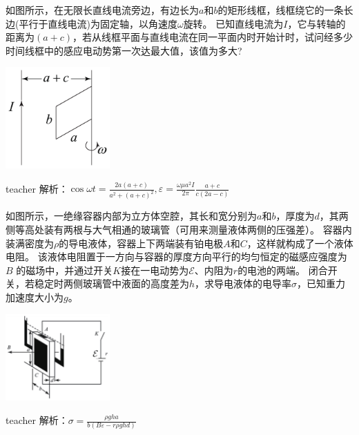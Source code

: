 \begin{example}
如图所示，在无限长直线电流旁边，有边长为$a $和$b $的矩形线框，线框绕它的一条长边(平行于直线电流)为固定轴，以角速度$\omega$旋转。
已知直线电流为$I$，它与转轴的距离为$(a+c)$，若从线框平面与直线电流在同一平面内时开始计时，试问经多少时间线框中的感应电动势第一次达最大值，该值为多大?
\begin{flushright}
\includegraphics[width = 0.3\textwidth]{images/mag-17.pdf} 
\end{flushright}
\begin{taggedblock}{teacher}
\noindent
解析：$\cos \omega t=\frac{2a(a+c)}{a^2+(a+c)^2},\varepsilon=\frac{\omega \mu a^2I}{2\pi}\frac{a+c}{c(2a-c)}$
\end{taggedblock}
\end{example}


\begin{example}

如图所示，一绝缘容器内部为立方体空腔，其长和宽分别为$a$和$b$，厚度为$d$，其两侧等高处装有两根与大气相通的玻璃管（可用来测量液体两侧的压强差）。
容器内装满密度为$\rho$的导电液体，容器上下两端装有铂电极$A $和$C$，这样就构成了一个液体电阻。
该液体电阻置于一方向与容器的厚度方向平行的均匀恒定的磁感应强度为$B$ 的磁场中，并通过开关$K $接在一电动势为$\mathcal{E}$、内阻为$r$的电池的两端。
闭合开关，若稳定时两侧玻璃管中液面的高度差为$h$，求导电液体的电导率$\sigma$，已知重力加速度大小为$g$。
\begin{flushright}
\includegraphics[width = 0.3\textwidth]{images/mag-29.pdf} 
\end{flushright}

\begin{taggedblock}{teacher}
\noindent
解析：$\sigma=\frac{\rho gha}{b(B\varepsilon-r\rho ghd)}$
\end{taggedblock}
\end{example}

